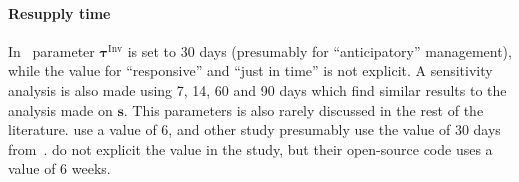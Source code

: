 \documentclass[main.tex]{subfiles}
\begin{document}

\paragraph{Resupply time}
\label{sec:resupply-time-param}

In~\textcite{hallegatte-2013-model-role} parameter
$\bm{\tau}^{\textrm{Inv}}$ is set to 30 days (presumably for ``anticipatory''
management), while the value for ``responsive'' and ``just in time''
is not explicit. A sensitivity analysis is also made using 7, 14, 60 and 90
days which find similar results to the analysis made on $\bm{s}$. This
parameters is also rarely discussed in the rest of the literature.
\Textcite{inoue-2018-firm-simul} use a value of 6, and other study presumably
use the value of 30 days from~\textcite{hallegatte-2013-model-role}.
\Textcite{guan-2020-global-suppl} do not explicit
the value in the study, but their open-source code uses a value of 6 weeks.



\onlyinsubfile{
{\printglossary[type=\acronymtype,title=Acronyms]}
\printbibliography
}
\end{document}
